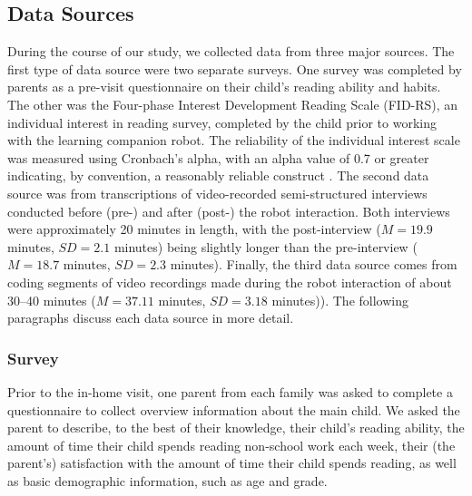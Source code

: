 \documentclass{sigchi}
\begin{document}
\subsection{Data Sources}
During the course of our study, we collected data from three major sources. The first type of data source were two separate surveys. One survey was completed by parents as a pre-visit questionnaire on their child's reading ability and habits. The other was the Four-phase Interest Development Reading Scale (FID-RS), an individual interest in reading survey, completed by the child prior to working with the learning companion robot. The reliability of the individual interest scale was measured using Cronbach's alpha, with an alpha value of 0.7 or greater indicating, by convention, a reasonably reliable construct \cite{Crocker:2009}. The second data source was from transcriptions of video-recorded semi-structured interviews conducted before (pre-) and after (post-) the robot interaction. Both interviews were approximately 20 minutes in length, with the post-interview ($M = 19.9$ minutes, $SD = 2.1$ minutes) being slightly longer than the pre-interview ($M = 18.7$ minutes, $SD = 2.3$ minutes). Finally, the third data source comes from coding segments of video recordings made during the robot interaction of about 30--40 minutes ($M = 37.11$ minutes, $SD = 3.18$ minutes)). The following paragraphs discuss each data source in more detail.


\subsubsection{Survey}
Prior to the in-home visit, one parent from each family was asked to complete a questionnaire to collect overview information about the main child. We asked the parent to describe, to the best of their knowledge, their child's reading ability, the amount of time their child spends reading non-school work each week, their (the parent's) satisfaction with the amount of time their child spends reading, as well as basic demographic information, such as age and grade.
 
\end{document}
